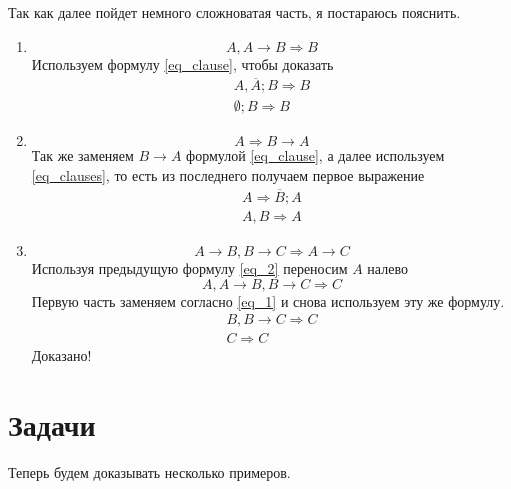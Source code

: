 Так как далее пойдет немного сложноватая часть, я постараюсь пояснить.
\begin{enumerate}
    \item
        \begin{equation}\label{eq_1}
            A, A \to B \Rightarrow B
        \end{equation}
        Используем формулу \ref{eq_clause}, чтобы доказать
        \begin{gather*}
            A, \overline A; B \Rightarrow B \\
            \emptyset; B \Rightarrow B
        \end{gather*}
    \item
        \begin{equation}\label{eq_2}
            A \Rightarrow B \to A
        \end{equation}
        Так же заменяем $B \to A$ формулой \ref{eq_clause},
        а далее используем \ref{eq_clauses}, то есть из последнего получаем первое выражение
        \begin{gather*}
            A \Rightarrow \overline B; A \\
            A, B \Rightarrow A
        \end{gather*}
    \item
        \begin{equation}\label{eq_3}
            A \to B, B \to C \Rightarrow A \to C
        \end{equation}
        Используя предыдущую формулу \ref{eq_2} переносим $A$ налево
        \begin{equation*}
            A, A \to B, B \to C \Rightarrow C
        \end{equation*}
        Первую часть заменяем согласно \ref{eq_1} и снова используем эту же формулу.
        \begin{gather*}
            B, B \to C \Rightarrow C \\
            C \Rightarrow C
        \end{gather*}
        Доказано!
\end{enumerate}

\section{Задачи}
Теперь будем доказывать несколько примеров.

